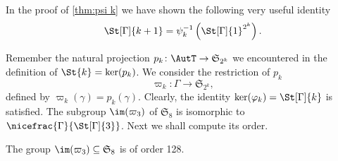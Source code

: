 \begin{rem}
In the proof of \cref{thm:psi k} we have shown the following very useful identity
\begin{equation*}
\St[\Gamma]{k+1}=\psi_{k}^{-1}\left(\St[\Gamma]{1}^{2^k}\right).
\end{equation*}
\end{rem}
Remember the natural projection $p_k\colon\AutT\to\mathfrak{S}_{2^k}$ we encountered in the definition of $\St{k}=\ker(p_k)$. We consider the restriction of $p_k$
\begin{equation*}
\varpi_k\colon\Gamma\to\mathfrak{S}_{2^k},
\end{equation*}
defined by $\varpi_k(\gamma)=p_k(\gamma)$. Clearly, the identity $\ker(\varphi_k)=\St[\Gamma]{k}$ is satisfied. The subgroup $\im(\varpi_3)$ of $\mathfrak{S}_8$ is isomorphic to $\nicefrac{\Gamma}{\St[\Gamma]{3}}$. Next we shall compute its order.
\begin{pro}\label{thm:pi Gamma}
The group $\im(\varpi_3)\subseteq\mathfrak{S}_8$ is of order 128.
\end{pro}

